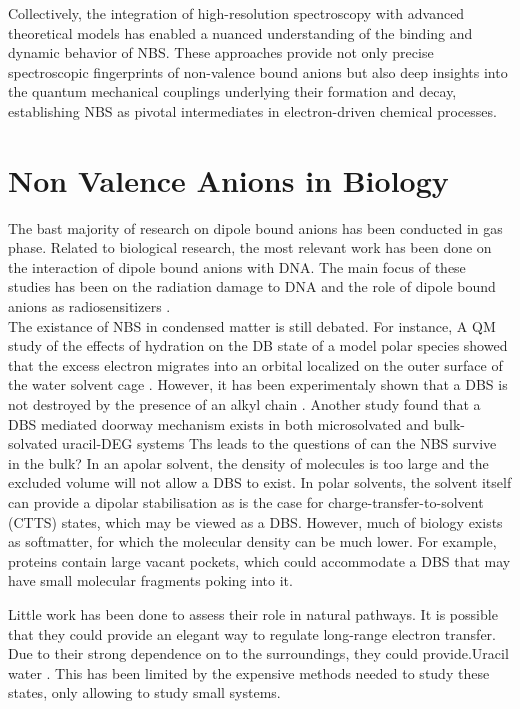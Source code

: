 Collectively, the integration of high-resolution spectroscopy with advanced theoretical models has enabled a nuanced understanding of the binding and dynamic behavior of NBS. These approaches provide not only precise spectroscopic fingerprints of non-valence bound anions but also deep insights into the quantum mechanical couplings underlying their formation and decay, establishing NBS as pivotal intermediates in electron-driven chemical processes.

\section{Non Valence Anions in Biology}
The bast majority of research on dipole bound anions has been conducted in gas phase. Related to biological research, the most relevant work has been done on the interaction of dipole bound anions with DNA. The main focus of these studies has been on the radiation damage to DNA \cite{narayanan2023secondary} and the role of dipole bound anions as radiosensitizers \cite{sedmidubska2024interaction}. \\
The existance of NBS in condensed matter is still debated. For instance, A QM study of the effects of hydration on the DB state of a model polar species showed that the excess electron migrates into an orbital localized on the outer surface of the water solvent cage \cite{anusiewicz2020fate}. However, it has been experimentaly shown that a DBS is not destroyed by the presence of an alkyl chain \cite{castellani2019stability}. Another study found that a DBS mediated doorway mechanism exists in both microsolvated and bulk-solvated uracil-DEG systems \cite{narayanan2024electron} Ths leads to the questions of can the NBS survive in the bulk? In an apolar solvent, the density of molecules is too large and the excluded volume will not allow a DBS to exist. In polar solvents, the solvent itself can provide a dipolar stabilisation as is the case for charge-transfer-to-solvent (CTTS) states,\cite{bradforth2002excited,chen2000precursors} which may be viewed as a DBS. However, much of biology exists as softmatter, for which the molecular density can be much lower. For example, proteins contain large vacant pockets, which
could accommodate a DBS that may have small molecular
fragments poking into it.

Little work has been done to assess their role in natural pathways. It is possible that they could provide an elegant way to regulate long-range electron transfer. Due to their strong dependence on to the surroundings, they could provide.Uracil water \cite{clarke2025role}.
This has been limited by the expensive methods needed to study these states, only allowing to study small systems.\\
